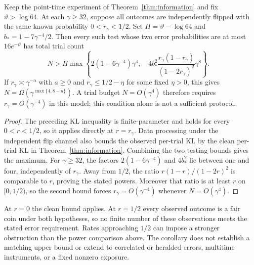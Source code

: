 \begin{corollary}\label{cor:readout-crossover}
Keep the point-time experiment of Theorem~\ref{thm:information} and fix
$\vartheta>\log64$. At each $\gamma\geq32$, suppose all outcomes are
independently flipped with the same known probability
$0<r_\gamma<1/2$. Set $H=\vartheta-\log64$ and
$b_*=1-7\gamma^{-4}/2$. Then every such test whose two error
probabilities are at most $16e^{-\vartheta}$ has total trial count
\[
 N>H\max\left\{2(1-6\gamma^{-4})\gamma^4,\quad
 4b_*^2\frac{r_\gamma(1-r_\gamma)}{(1-2r_\gamma)^2}\gamma^8\right\}.
\]
If $r_\gamma\asymp\gamma^{-a}$ with $a\geq0$ and
$r_\gamma\leq1/2-\eta$ for some fixed $\eta>0$, this gives
$N=\Omega(\gamma^{\max\{4,8-a\}})$. A trial budget
$N=O(\gamma^4)$ therefore requires $r_\gamma=O(\gamma^{-4})$
in this model; this condition alone is not a sufficient protocol.
\end{corollary}
\begin{proof}
The preceding KL inequality is finite-parameter and holds for every
$0<r<1/2$, so it applies directly at $r=r_\gamma$. Data processing under
the independent flip channel also bounds the observed per-trial KL by
the clean per-trial KL in Theorem~\ref{thm:information}. Combining the
two testing bounds gives the maximum. For $\gamma\geq32$, the factors
$2(1-6\gamma^{-4})$ and $4b_*^2$ lie between one and four, independently
of $r_\gamma$. Away from $1/2$, the ratio
$r(1-r)/(1-2r)^2$ is comparable to $r$, proving the stated powers.
Moreover that ratio is at least $r$ on $[0,1/2)$, so the second bound
forces $r_\gamma=O(\gamma^{-4})$ whenever $N=O(\gamma^4)$.
\end{proof}
At $r=0$ the clean bound applies. At $r=1/2$ every observed outcome is a
fair coin under both hypotheses, so no finite number of these observations
meets the stated error requirement. Rates approaching $1/2$ can impose
a stronger obstruction than the power comparison above. The corollary
does not establish a matching upper bound or extend to correlated or
heralded errors, multitime instruments, or a fixed nonzero exposure.

